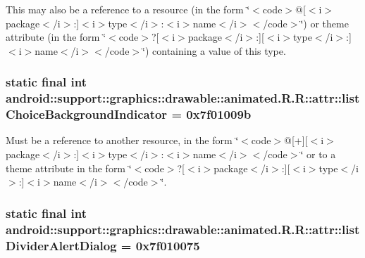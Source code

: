 This may also be a reference to a resource (in the form \char`\"{}$<$code$>$@\mbox{[}$<$i$>$package$<$/i$>$:\mbox{]}$<$i$>$type$<$/i$>$:$<$i$>$name$<$/i$>$$<$/code$>$\char`\"{}) or theme attribute (in the form \char`\"{}$<$code$>$?\mbox{[}$<$i$>$package$<$/i$>$:\mbox{]}\mbox{[}$<$i$>$type$<$/i$>$:\mbox{]}$<$i$>$name$<$/i$>$$<$/code$>$\char`\"{}) containing a value of this type. \hypertarget{classandroid_1_1support_1_1graphics_1_1drawable_1_1animated_1_1_r_1_1attr_6f8968dd3943a20d86455d3a31a3ce7a}{
\subsubsection[{listChoiceBackgroundIndicator}]{\setlength{\rightskip}{0pt plus 5cm}static final int android::support::graphics::drawable::animated.R.R::attr::listChoiceBackgroundIndicator = 0x7f01009b}}
\label{classandroid_1_1support_1_1graphics_1_1drawable_1_1animated_1_1_r_1_1attr_6f8968dd3943a20d86455d3a31a3ce7a}


Must be a reference to another resource, in the form \char`\"{}$<$code$>$@\mbox{[}+\mbox{]}\mbox{[}$<$i$>$package$<$/i$>$:\mbox{]}$<$i$>$type$<$/i$>$:$<$i$>$name$<$/i$>$$<$/code$>$\char`\"{} or to a theme attribute in the form \char`\"{}$<$code$>$?\mbox{[}$<$i$>$package$<$/i$>$:\mbox{]}\mbox{[}$<$i$>$type$<$/i$>$:\mbox{]}$<$i$>$name$<$/i$>$$<$/code$>$\char`\"{}. \hypertarget{classandroid_1_1support_1_1graphics_1_1drawable_1_1animated_1_1_r_1_1attr_7989bc510bd607508dcd1ae805e36a51}{
\subsubsection[{listDividerAlertDialog}]{\setlength{\rightskip}{0pt plus 5cm}static final int android::support::graphics::drawable::animated.R.R::attr::listDividerAlertDialog = 0x7f010075}}
\label{classandroid_1_1support_1_1graphics_1_1drawable_1_1animated_1_1_r_1_1attr_7989bc510bd607508dcd1ae805e36a51}


